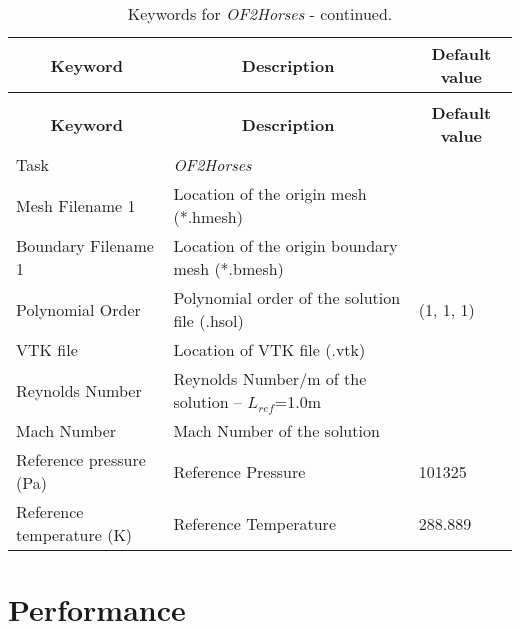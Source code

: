 \documentclass[a4paper,10pt]{report}
\begin{document}
\begin{longtable}{|p{5cm}|p{9cm}|p{2.2cm}|}
\caption{Keywords for \textit{OF2Horses}.} \label{tab:OF2Horses} \\
\hline
\multicolumn{1}{|c|}{\textbf{Keyword}} & \multicolumn{1}{c|}{\textbf{Description}} & \multicolumn{1}{c|}{\textbf{Default value}} \\ \hline
\endfirsthead

\caption{Keywords for \textit{OF2Horses} - continued.} \\
\hline
\multicolumn{1}{|c|}{\textbf{Keyword}} & \multicolumn{1}{c|}{\textbf{Description}} & \multicolumn{1}{c|}{\textbf{Default value}} \\ \hline
\endhead

Task 	        		& \textit{OF2Horses} 						&  \\ \hline
Mesh Filename 1 		& Location of the origin mesh (*.hmesh) 	&  \\ \hline
Boundary Filename 1 	& Location of the origin boundary mesh (*.bmesh) 	&  \\ \hline
Polynomial Order 	& Polynomial order of the solution file (.hsol)  & (1, 1, 1) \\ \hline
VTK file         	& Location of VTK file (.vtk)   &             \\ \hline
Reynolds Number    	& Reynolds Number/m of the solution -- $L_{ref}$=1.0m   &             \\ \hline
Mach Number         	& Mach Number of the solution      &             \\ \hline
Reference pressure (Pa)         	& Reference Pressure   & 101325             \\ \hline
Reference temperature (K)        & Reference Temperature   & 288.889             \\ \hline

\end{longtable}


\chapter{Performance}
\end{document}
